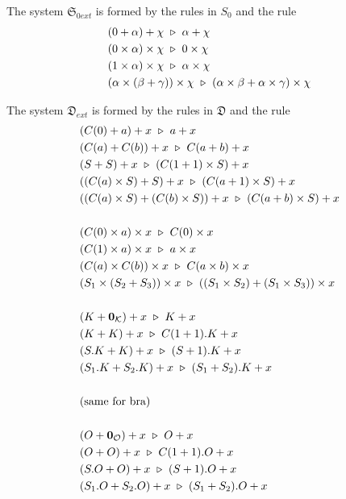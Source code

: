 \begin{proposition}
  The system $\mathfrak{S}_{0ext}$ is formed by the rules in $S_0$ and the rule
  \begin{align*}
    & (0 + \alpha) + \chi \ \triangleright\  \alpha + \chi \\
    & (0 \times \alpha) \times \chi \ \triangleright\  0 \times \chi \\
    & (1 \times \alpha) \times \chi \ \triangleright\  \alpha \times \chi \\
    & (\alpha \times (\beta + \gamma)) \times \chi \ \triangleright\  (\alpha \times \beta + \alpha \times \gamma) \times \chi \\
  \end{align*}
\end{proposition}

\begin{proposition}
  The system $\mathfrak{D}_{ext}$ is formed by the rules in $\mathfrak{D}$ and the rule
  \begin{align*}
    & (C(0) + a) + x \ \triangleright\  a + x \\
    & (C(a) + C(b)) + x \ \triangleright\  C(a + b) + x \\
    & (S + S) + x \ \triangleright\  (C(1 + 1) \times S) + x \\
    & ((C(a) \times S) + S) + x \ \triangleright\  (C(a + 1) \times S) + x \\
    & ((C(a) \times S) + (C(b) \times S)) + x \ \triangleright\  (C(a + b) \times S) + x \\
    \\
    & (C(0) \times a) \times x \ \triangleright\  C(0) \times x \\
    & (C(1) \times a) \times x \ \triangleright\  a \times x \\
    & (C(a) \times C(b)) \times x \ \triangleright\  C(a \times b) \times x \\
    & (S_1 \times (S_2 + S_3)) \times x \ \triangleright\  ((S_1 \times S_2) + (S_1 \times S_3)) \times x \\
    \\
    & (K + \mathbf{0}_\mathcal{K}) + x \ \triangleright\  K + x \\
    & (K + K) + x \ \triangleright\  C(1 + 1).K + x \\
    & (S.K + K) + x \ \triangleright\  (S + 1).K + x \\
    & (S_1.K + S_2.K) + x \ \triangleright\  (S_1 + S_2).K + x \\
    \\
    & \textrm{(same for bra)}\\
    \\
    & (O + \mathbf{0}_\mathcal{O}) + x \ \triangleright\  O + x \\
    & (O + O) + x \ \triangleright\  C(1 + 1).O + x \\
    & (S.O + O) + x \ \triangleright\  (S + 1).O + x \\
    & (S_1.O + S_2.O) + x \ \triangleright\  (S_1 + S_2).O + x
  \end{align*}
\end{proposition}

